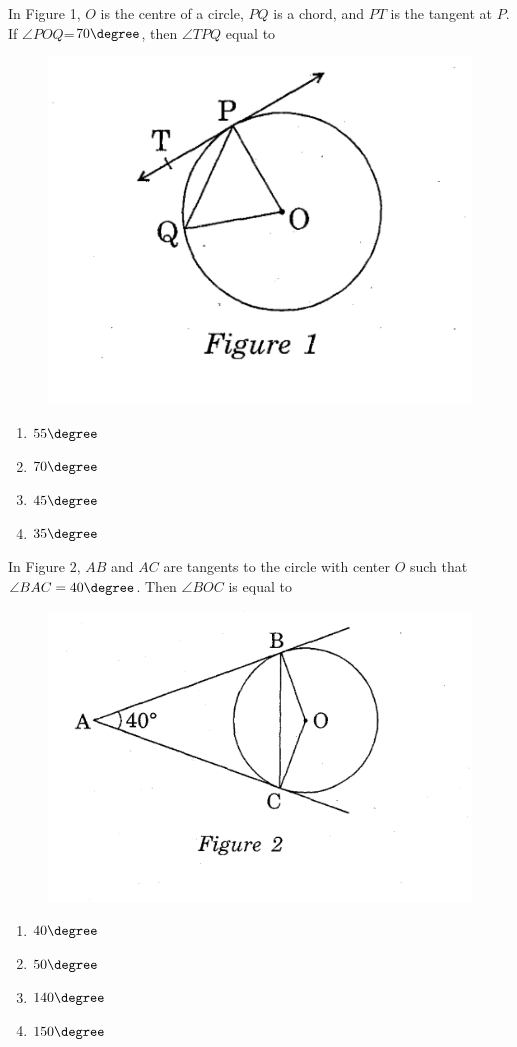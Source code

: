 \item In Figure 1, $O$ is the centre of a circle, $PQ$ is a chord, and $PT$ is the tangent at $P$. If $\angle{POQ}$=$70\degree$, then $\angle{TPQ}$ equal to
    \begin{figure}[H]
    \centering
    \includegraphics[width=0.8\columnwidth]{figs/figure1.jpg.png}
    \end{figure}
    \begin{enumerate}[label=(\Alph*)]
        \item $55\degree$
        \item $70\degree$
        \item $45\degree$
        \item $35\degree$
    \end{enumerate}
    
    \item In Figure $2$, $AB$ and $AC$ are tangents to the circle with center $O$ such that $\angle{BAC} = 40\degree$. Then $\angle{BOC}$ is equal to
    \begin{figure}[H]
    \centering
    \includegraphics[width=0.8\columnwidth]{figs/figure2.jpg.png}
    \end{figure}
    \begin{enumerate}[label=(\Alph*)]
        \item $40\degree$
        \item $50\degree$
        \item $140\degree$
        \item $150\degree$
    \end{enumerate}

